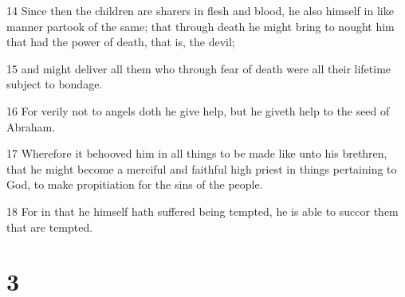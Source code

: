 \par 14 Since then the children are sharers in flesh and blood, he also himself in like manner partook of the same; that through death he might bring to nought him that had the power of death, that is, the devil;
\par 15 and might deliver all them who through fear of death were all their lifetime subject to bondage.
\par 16 For verily not to angels doth he give help, but he giveth help to the seed of Abraham.
\par 17 Wherefore it behooved him in all things to be made like unto his brethren, that he might become a merciful and faithful high priest in things pertaining to God, to make propitiation for the sins of the people.
\par 18 For in that he himself hath suffered being tempted, he is able to succor them that are tempted.

\chapter{3}

